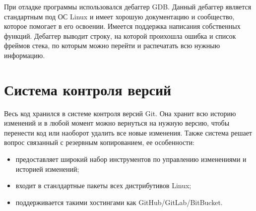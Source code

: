 При отладке программы использовался дебаггер GDB. Данный дебаггер является стандартным под ОС Linux и имеет хорошую документацию и сообщество, которое помогает в его освоении. Имеется поддержка написания собственных функций. Дебаггер выводит строку, на которой проихошла ошибка и список фреймов стека, по которым можно перейти и распечатать всю нужныю информацию.

\section{Система контроля версий}
Весь код хранился в системе контроля версий Git. Она хранит всю историю изменений и в любой момент можно вернуться на нужную версию, чтобы перенести код или наоборот удалить все новые изменения. Также система решает вопрос связанный с резервным копированием, ее особенности:
\begin{itemize}
	\item предоставляет широкий набор инструментов по управлению изменениями и историей изменений;
	\item входит в станлдартные пакеты всех дистрибутивов Linux;
	\item поддерживается такими хостингами как GitHub/GitLab/BitBucket.
\end{itemize}